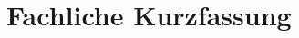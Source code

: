 \documentclass[hidelinks]{article}
\begin{document}
    \section{Fachliche Kurzfassung}
\end{document}
